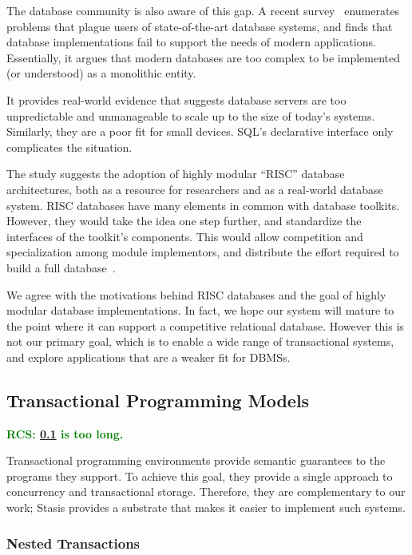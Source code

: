 \documentclass[letterpaper,twocolumn,10pt]{article}
\newcommand{\yad}{Stasis\xspace}
\newcommand{\rcs}[1]{\textcolor{green}{\bf RCS: #1}}
\begin{document}
The database community is also aware of this gap.  A recent
survey~\cite{riscDB} enumerates problems that plague users of
state-of-the-art database systems, and finds that database
implementations fail to support the needs of modern applications.
Essentially, it argues that modern databases are too complex to be
implemented (or understood) as a monolithic entity.

It provides real-world evidence that suggests database servers are too
unpredictable and unmanageable to scale up to the size of today's
systems.  Similarly, they are a poor fit for small devices.  SQL's
declarative interface only complicates the situation.

The study suggests the adoption of highly modular ``RISC'' database
architectures, both as a resource for researchers and as a real-world
database system.  RISC databases have many elements in common with
database toolkits.  However, they would take the idea one step
further, and standardize the interfaces of the toolkit's components.
This would allow competition and specialization among module
implementors, and distribute the effort required to build a full
database~\cite{riscDB}.

We agree with the motivations behind RISC databases and the goal
of highly modular database implementations.  In fact, we  hope
 our system will mature to the point where it can support a
competitive relational database.  However this is not our primary
goal, which is to enable a wide range of transactional systems, and
explore applications that are a weaker fit for DBMSs.

\subsection{Transactional Programming Models}

\label{sec:transactionalProgramming}

\rcs{\ref{sec:transactionalProgramming} is too long.}

Transactional programming environments provide semantic guarantees to
the programs they support.  To achieve this goal, they provide a
single approach to concurrency and transactional storage.
Therefore, they are complementary to our work; \yad provides a
substrate that makes it easier to implement such systems.

\subsubsection{Nested Transactions}
\end{document}
